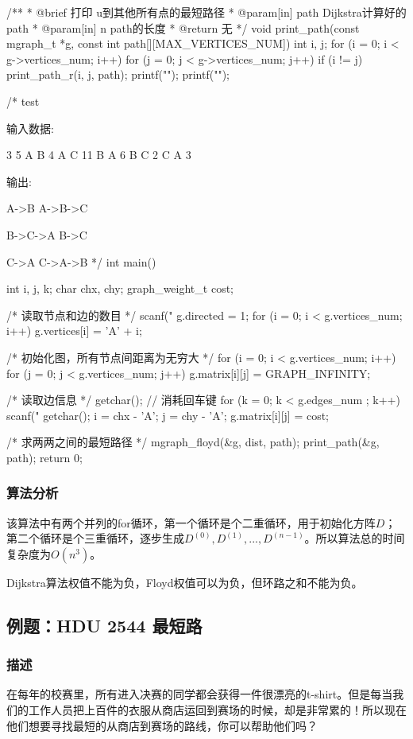 \begin{Codex}[label=mgraph_floyd.c]
/**
 * @brief 打印 u到其他所有点的最短路径
 * @param[in] path Dijkstra计算好的path
 * @param[in] n path的长度
 * @return 无
 */
void print_path(const mgraph_t *g, const int path[][MAX_VERTICES_NUM]) {
    int i, j;
    for (i = 0; i < g->vertices_num; i++) {
        for (j = 0; j < g->vertices_num; j++) {
            if (i != j) {
                print_path_r(i, j, path);
                printf("\n");
            }
        }
        printf("\n");
    }
}


/* test

输入数据:

3 5
A B 4
A C 11
B A 6
B C 2
C A 3

输出:

A->B
A->B->C

B->C->A
B->C

C->A
C->A->B
*/
int main() {
    int i, j, k;
    char chx, chy;
    graph_weight_t cost;

    /* 读取节点和边的数目 */
    scanf("%
    g.directed = 1;
    for (i = 0; i < g.vertices_num; i++) g.vertices[i] = 'A' + i;

    /* 初始化图，所有节点间距离为无穷大 */
    for (i = 0; i < g.vertices_num; i++) {
        for (j = 0; j < g.vertices_num; j++) {
            g.matrix[i][j] = GRAPH_INFINITY;
        }
    }

    /* 读取边信息 */
    getchar(); // 消耗回车键
    for (k = 0; k < g.edges_num ; k++) {
        scanf("%
        getchar();
        i = chx - 'A';
        j = chy - 'A';
        g.matrix[i][j] = cost;
    }

    /* 求两两之间的最短路径 */
    mgraph_floyd(&g, dist, path);
    print_path(&g, path);
    return 0;
}
\end{Codex}

\subsubsection{算法分析}
该算法中有两个并列的for循环，第一个循环是个二重循环，用于初始化方阵$D$；第二个循环是个三重循环，逐步生成$D^{(0)}, D^{(1)} ,...,D^{(n-1)}$。所以算法总的时间复杂度为$O(n^3)$。

Dijkstra算法权值不能为负，Floyd权值可以为负，但环路之和不能为负。


\subsection{例题：HDU 2544 最短路}
\subsubsection{描述}
在每年的校赛里，所有进入决赛的同学都会获得一件很漂亮的t-shirt。但是每当我们的工作人员把上百件的衣服从商店运回到赛场的时候，却是非常累的！所以现在他们想要寻找最短的从商店到赛场的路线，你可以帮助他们吗？


